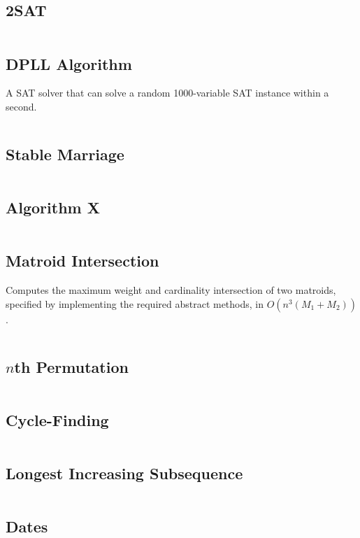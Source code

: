 \documentclass[8pt,a4paper,landscape,oneside]{amsart}
\newcommand{\code}[1]{\inputminted[fontsize=\normalsize,baselinestretch=1]{cpp}{_code/#1}}
\newif\ifverbose
\begin{document}
\begin{multicols*}{3}
  \subsection{2SAT}
    \ifverbose
    A fast 2SAT solver.
    \fi
    \code{other/two_sat.cpp}
  \subsection{DPLL Algorithm}
    A SAT solver that can solve a random 1000-variable SAT instance within a second.
    \code{other/dpll.cpp}
  \subsection{Stable Marriage}
    \ifverbose
    The Gale-Shapley algorithm for solving the stable marriage problem.
    \fi
    \code{other/stable_marriage.cpp}
  \subsection{Algorithm X}
    \ifverbose
    An implementation of Knuth's Algorithm X, using dancing links. Solves the Exact Cover problem.
    \fi
    \code{other/algorithm_x.cpp}
  \subsection{Matroid Intersection}
    Computes the maximum weight and cardinality intersection of two
    matroids, specified by implementing the required abstract methods, in
    $O(n^3(M_1+M_2))$.
    \code{other/matroid_intersection.cpp}
  \subsection{$n$th Permutation}
    \ifverbose
    A very fast algorithm for computing the $n$th permutation of the list
    $\{0,1,\ldots,k-1\}$.
    \fi
    \code{other/nth_permutation.cpp}
  \subsection{Cycle-Finding}
    \ifverbose
    An implementation of Floyd's Cycle-Finding algorithm.
    \fi
    \code{other/floyds_algorithm.cpp}
  \subsection{Longest Increasing Subsequence}
    \code{other/lis.cpp}
  \subsection{Dates}
    \ifverbose
    Functions to simplify date calculations.
    \fi
    \code{other/dates.cpp}

\end{multicols*}
\end{document}
